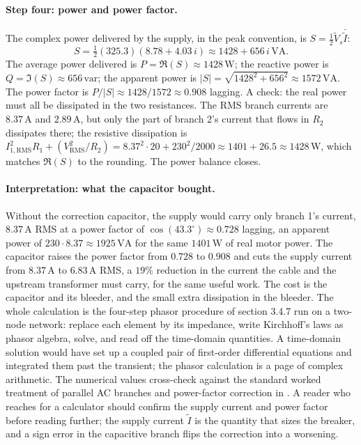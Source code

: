 \paragraph{Step four: power and power factor.} The complex power
delivered by the supply, in the peak convention, is $S = \tfrac{1}{2}
\tilde V_{s}\bar{\tilde I}$:
\[
S = \tfrac{1}{2}(325.3)(8.78 + 4.03\,i)
\approx 1428 + 656\,i\,\text{VA}.
\]
The average power delivered is $P = \Re(S) \approx 1428\,\si{\watt}$;
the reactive power is $Q = \Im(S) \approx 656\,\text{var}$; the apparent
power is $|S| = \sqrt{1428^{2} + 656^{2}} \approx 1572\,\text{VA}$.
The power factor is $P/|S| \approx 1428/1572 \approx 0.908$ lagging.
A check: the real power must all be dissipated in the two resistances.
The RMS branch currents are $8.37\,\si{\ampere}$ and $2.89\,\si
{\ampere}$, but only the part of branch 2's current that flows in
$R_{2}$ dissipates there; the resistive dissipation is $I_{1,\text{RMS}}^{2}
R_{1} + (V_{\text{RMS}}^{2}/R_{2}) = 8.37^{2}\cdot 20 + 230^{2}/2000
\approx 1401 + 26.5 \approx 1428\,\si{\watt}$, which matches $\Re(S)$
to the rounding. The power balance closes.

\paragraph{Interpretation: what the capacitor bought.} Without the
correction capacitor, the supply would carry only branch 1's current,
$8.37\,\si{\ampere}$ RMS at a power factor of $\cos(43.3^{\circ})
\approx 0.728$ lagging, an apparent power of $230 \cdot 8.37 \approx
1925\,\text{VA}$ for the same $1401\,\si{\watt}$ of real motor
power. The capacitor raises the power factor from $0.728$ to $0.908$
and cuts the supply current from $8.37\,\si{\ampere}$ to $6.83\,\si
{\ampere}$ RMS, a $19\%$ reduction in the current the cable and the
upstream transformer must carry, for the same useful work. The cost is
the capacitor and its bleeder, and the small extra dissipation in the
bleeder. The whole calculation is the four-step phasor procedure of
section 3.4.7 run on a two-node network: replace each element by its
impedance, write Kirchhoff's laws as phasor algebra, solve, and read
off the time-domain quantities. A time-domain solution would have set
up a coupled pair of first-order differential equations and integrated
them past the transient; the phasor calculation is a page of complex
arithmetic. The numerical values cross-check against the standard
worked treatment of parallel AC branches and power-factor correction
in \cite[chapter 10]{text:v2ch03-nilsson-riedel}. A reader who reaches
for a calculator should confirm the supply current and power factor
before reading further; the supply current $\tilde I$ is the quantity
that sizes the breaker, and a sign error in the capacitive branch
flips the correction into a worsening.

